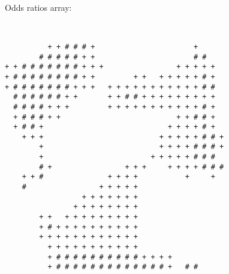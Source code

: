 \begin{multicols*}{2}
\begin{Verbatim}[samepage=true]
\end{Verbatim}
Odds ratios array:
\begin{Verbatim}[samepage=true]
                                                        
                                                        
          + + # # # +                       +           
        # # # # # + +                       # #         
+ + # # # # # # # + + +                 + + + + +       
+ # # # # # # # # + +         + +   + + + + + # +       
+ # # # # # # # + + +   + + + + + + + + + + + # #       
  # # # # # # + +       + + # # + + + + + + + + +       
  # # # # + + +         + + + + + + + + + + + # +       
  + # # # + +                           + + # # +       
  + # # +                             + + + + # +       
    + + +                           + + + + + # # +     
        +                           + + + + # # # +     
        +                         + + + + + # # #       
        # +                 + + +     + + + + # # #     
    + + #               + + + +           +     +       
    #                 + + + + +                         
                  + + + + + + +                         
                + + + + + + + +                         
        + +   + + + + + + + + +                         
        + # + + + + + + + + + +                         
        + + + + + + + + + + + +                         
          + + + + + + + + + + +                         
          + # # # # # # # # # # + + + +                 
          + # # # # # # # # # # # # # +   # #           
\end{Verbatim}
\newpage

\end{multicols*}
